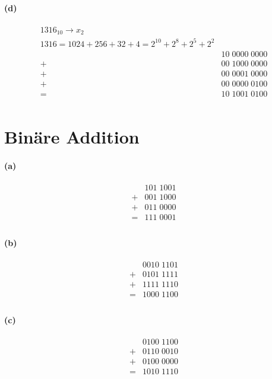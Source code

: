 \documentclass[a4paper]{article}
\begin{document}
\paragraph{(d)}
\begin{align*}
    1316_{10}\rightarrow x_2\\
    1316 = 1024+256+32+4=2^{10}+2^8+2^5+2^2\\
    &10\;0000\;0000\\
    +&00\;1000\;0000\\
    +&00\;0001\;0000\\
    +&00\;0000\;0100\\
    =&10\;1001\;0100\\
\end{align*}

\section{Binäre Addition}
\paragraph{(a)}
\begin{align*}
    &101\;1001\\
    +&001\;1000\\
    +&011\;0000\\
    =&111\;0001\\
\end{align*}

\paragraph{(b)}
\begin{align*}
    &0010\;1101\\
    +&0101\;1111\\
    +&1111\;1110\\
    =&1000\;1100\\
\end{align*}

\paragraph{(c)}
\begin{align*}
    &0100\;1100\\
    +&0110\;0010\\
    +&0100\;0000\\
    =&1010\;1110\\
\end{align*}
\end{document}
